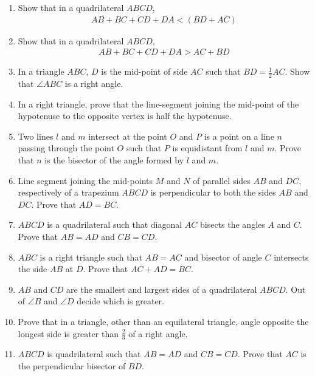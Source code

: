 \documentclass {article}
\begin{document}
\begin {enumerate}
\item Show that in a quadrilateral $ABCD$, 
\begin{align}
     AB + BC + CD + DA  <  (BD + AC)
\end{align} 
\item Show that in a quadrilateral $ABCD$,
\begin{align}
 AB + BC + CD + DA  >   AC + BD
\end{align}
\item In a triangle $ABC$, $D$ is the mid-point of side $AC$ such that $ BD = \frac{1}{2} AC $. Show that $\angle ABC$ is a right angle.
\item In a right triangle, prove that the line-segment joining the mid-point of the hypotenuse to the opposite vertex is half the hypotenuse.
\item Two lines $l$ and $m$ intersect at the point $O$ and $P$ is a point on a line $n$ passing through the point $O$ such that $P$ is equidistant from $l$ and $m$. Prove that $n$ is the bisector of the angle formed by $l$ and $m$.
\item Line segment joining the mid-points $M$ and $N$ of parallel sides $AB$ and $DC$, respectively of a trapezium $ABCD$ is perpendicular to both the sides $AB$ and $DC$. Prove that $AD = BC$.
\item $ABCD$ is a quadrilateral such that diagonal $AC$ bisects the angles $A$ and $C$. Prove that $AB = AD$ and $CB = CD$.
\item $ABC$ is a right triangle such that $AB = AC$ and bisector of angle $C$ intersects the side $AB$ at $D$. Prove that $AC + AD = BC$.
\item $AB$ and $CD$ are the smallest and largest sides of a quadrilateral $ABCD$. Out of $\angle B$ and $\angle D$ decide which is greater.
\item Prove that in a triangle, other than an equilateral triangle, angle opposite the longest side is greater than $\frac{2}{3}$ of a right angle.
\item $ABCD$ is quadrilateral such that $AB = AD$ and $CB = CD$. Prove that $AC$ is the perpendicular bisector of $BD$.
\end{enumerate}
\end{document}
